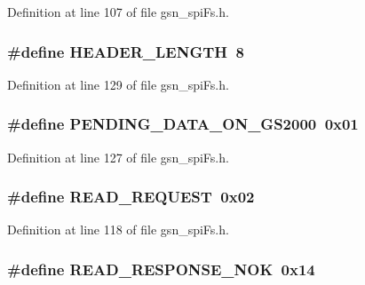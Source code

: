 Definition at line 107 of file gsn\_\-spiFs.h.

\hypertarget{a00589_acaf400df9a74b3295697ca29cc9261cb}{
\subsubsection[{HEADER\_\-LENGTH}]{\setlength{\rightskip}{0pt plus 5cm}\#define HEADER\_\-LENGTH~8}}
\label{a00589_acaf400df9a74b3295697ca29cc9261cb}


Definition at line 129 of file gsn\_\-spiFs.h.

\hypertarget{a00589_a7c37cc67ba42cab17793abaf5eefe850}{
\subsubsection[{PENDING\_\-DATA\_\-ON\_\-GS2000}]{\setlength{\rightskip}{0pt plus 5cm}\#define PENDING\_\-DATA\_\-ON\_\-GS2000~0x01}}
\label{a00589_a7c37cc67ba42cab17793abaf5eefe850}


Definition at line 127 of file gsn\_\-spiFs.h.

\hypertarget{a00589_ab8b31ace42d6cdb829200d1b45e39ca0}{
\subsubsection[{READ\_\-REQUEST}]{\setlength{\rightskip}{0pt plus 5cm}\#define READ\_\-REQUEST~0x02}}
\label{a00589_ab8b31ace42d6cdb829200d1b45e39ca0}


Definition at line 118 of file gsn\_\-spiFs.h.

\hypertarget{a00589_a9ae728298b7c0c38e03d1636850773d5}{
\subsubsection[{READ\_\-RESPONSE\_\-NOK}]{\setlength{\rightskip}{0pt plus 5cm}\#define READ\_\-RESPONSE\_\-NOK~0x14}}
\label{a00589_a9ae728298b7c0c38e03d1636850773d5}


